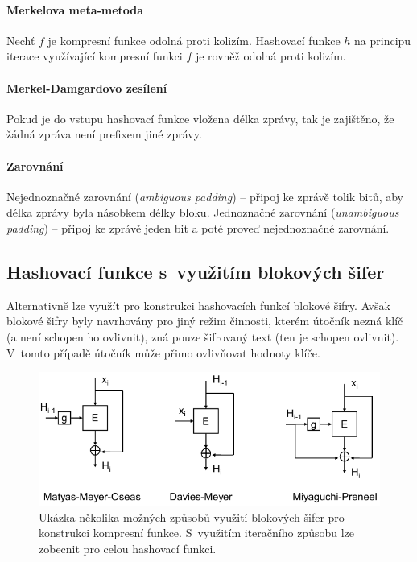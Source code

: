 \paragraph*{Merkelova meta-metoda} Nechť $f$ je kompresní funkce odolná proti kolizím. Hashovací funkce $h$ na principu iterace využívající kompresní funkci $f$ je rovněž odolná proti kolizím.

\paragraph*{Merkel-Damgardovo zesílení} Pokud je do vstupu hashovací funkce vložena délka zprá\-vy, tak je zajištěno, že žádná zpráva není prefixem jiné zprávy.

\paragraph*{Zarovnání} Nejednoznačné zarovnání (\textit{ambiguous padding}) -- připoj ke zprávě tolik bitů, aby délka zprávy byla násobkem délky bloku. Jednoznačné zarovnání (\textit{unambiguous padding}) -- připoj ke zprávě jeden bit a poté proveď nejednoznačné zarovnání.

\subsection{Hashovací funkce s~využitím blokových šifer}

Alternativně lze využít pro konstrukci hashovacích funkcí blokové šifry. Avšak blokové šifry byly navrhovány pro jiný režim činnosti, kterém útočník nezná klíč (a není schopen ho ovlivnit), zná pouze šifrovaný text (ten je schopen ovlivnit). V~tomto případě útočník může přimo ovlivňovat hodnoty klíče.

\begin{figure}[H]
    \centering
    \includegraphics[width=0.9\linewidth]{hash_function_blocks.pdf}
    \caption{Ukázka několika možných způsobů využití blokových šifer pro konstrukci kompresní funkce. S~využitím iteračního způsobu lze zobecnit pro celou hashovací funkci.}
\end{figure}


